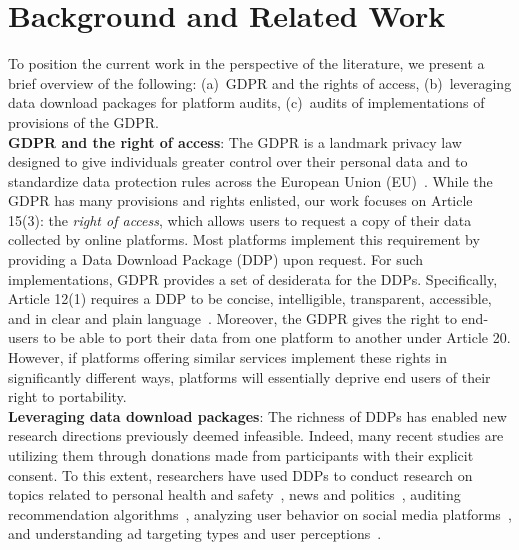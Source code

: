 \section{Background and Related Work}\label{Sec: Related}

To position the current work in the perspective of the literature, we present a brief overview of the following: (a)~GDPR and the rights of access, (b)~leveraging data download packages for platform audits, (c)~audits of implementations of provisions of the GDPR.\\%
\noindent
\textbf{GDPR and the right of access}:
The GDPR is a landmark privacy law designed to give individuals greater control over their personal data and to standardize data protection rules across the European Union (EU)~\cite{EU2016GDPR}.
While the GDPR has many provisions and rights enlisted, our work focuses on Article 15(3): the \textit{right of access}, which allows users to request a copy of their data collected by online platforms. Most platforms implement this requirement by providing a Data Download Package (DDP) upon request.
For such implementations, GDPR provides a set of desiderata for the DDPs.
Specifically, Article 12(1) requires a DDP to be concise, intelligible, transparent, accessible, and in clear and plain language~\cite{EU2016GDPR}.
Moreover, the GDPR gives the right to end-users to be able to port their data from one platform to another under Article 20. 
However, if platforms offering similar services implement these rights in significantly different ways, platforms will essentially deprive end users of their right to portability.\\
\noindent
\textbf{Leveraging data download packages}:
The richness of DDPs has enabled new research directions previously deemed infeasible.
Indeed, many recent studies are utilizing them through donations made from participants with their explicit consent.
To this extent, researchers have used DDPs to conduct research on topics related to personal health and safety~\cite{kmetty2022identifying, yang2024coupling, alsoubai2024profiling}, news and politics~\cite{blassnig2023googling, 2023haimintegratin, hase2024can}, auditing recommendation algorithms~\cite{moller2023detecting, vombatkere2024tiktok}, analyzing user behavior on social media platforms~\cite{zannettou2024analyzing, garimella2024whatsapp}, and understanding ad targeting types and user perceptions~\cite{wei2020twitter}.\\
